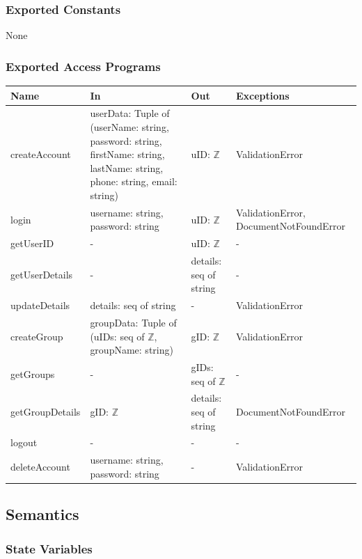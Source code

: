 \documentclass[12pt, titlepage]{article}
\begin{document}
\subsubsection{Exported Constants}

None

\subsubsection{Exported Access Programs}

\begin{center}
\begin{tabular}{p{3cm} p{4.5cm} p{4cm} p{4.5cm}}
\hline
\textbf{Name} & \textbf{In} & \textbf{Out} & \textbf{Exceptions} \\
\hline
createAccount & userData: Tuple of (userName: string, password: string, firstName: string, lastName: string, phone: string, email: string) & uID: $\mathbb{Z}$ & ValidationError \\
\hline
login & username: string, password: string & uID: $\mathbb{Z}$ & ValidationError, DocumentNotFoundError \\
\hline
getUserID & - & uID: $\mathbb{Z}$ & - \\
\hline
getUserDetails & - & details: seq of string & - \\
\hline
updateDetails & details: seq of string & - & ValidationError \\
\hline
createGroup & groupData: Tuple of (uIDs: seq of $\mathbb{Z}$, groupName: string) & gID: $\mathbb{Z}$   & ValidationError \\
\hline
getGroups & -  & gIDs: seq of $\mathbb{Z}$  & - \\
\hline
getGroupDetails & gID: $\mathbb{Z}$ & details: seq of string & DocumentNotFoundError \\
\hline
logout & - & - & - \\
\hline
deleteAccount & username: string, password: string & - & ValidationError \\
\hline
\end{tabular}
\end{center}

\subsection{Semantics}

\subsubsection{State Variables}
\end{document}
